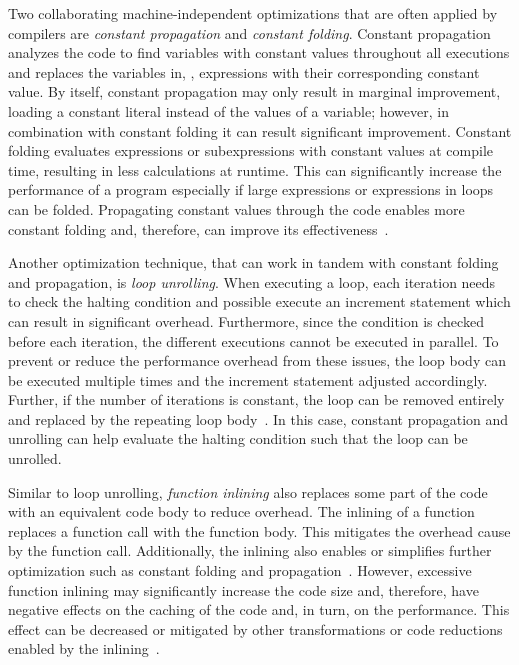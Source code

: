 Two collaborating machine-independent optimizations that are often applied by compilers are \emph{constant propagation} and \emph{constant folding}. Constant propagation analyzes the code to find variables with constant values throughout all executions and replaces the variables in, \eg, expressions with their corresponding constant value. By itself, constant propagation may only result in marginal improvement, loading a constant literal instead of the values of a variable; however, in combination with constant folding it can result significant improvement. Constant folding evaluates expressions or subexpressions with constant values at compile time, resulting in less calculations at runtime. This can significantly increase the performance of a program especially if large expressions or expressions in loops can be folded. Propagating constant values through the code enables more constant folding and, therefore, can improve its effectiveness~\cite{WeZa91}.

Another optimization technique, that can work in tandem with constant folding and propagation, is \emph{loop unrolling}. When executing a loop, each iteration needs to check the halting condition and possible execute an increment statement which can result in significant overhead. Furthermore, since the condition is checked before each iteration, the different executions cannot be executed in parallel. To prevent or reduce the performance overhead from these issues, the loop body can be executed multiple times and the increment statement adjusted accordingly. Further, if the number of iterations is constant, the loop can be removed entirely and replaced by the repeating loop body~\cite{HuLe99}. In this case, constant propagation and unrolling can help evaluate the halting condition such that the loop can be unrolled. 

Similar to loop unrolling, \emph{function inlining} also replaces some part of the code with an equivalent code body to reduce overhead. The inlining of a function replaces a function call with the function body. This mitigates the overhead cause by the function call. Additionally, the inlining also enables or simplifies further optimization such as constant folding and propagation~\cite{TGS22}. However, excessive function inlining may significantly increase the code size and, therefore, have negative effects on the caching of the code and, in turn, on the performance. This effect can be decreased or mitigated by other transformations or code reductions enabled by the inlining~\cite{PeMa02}.

